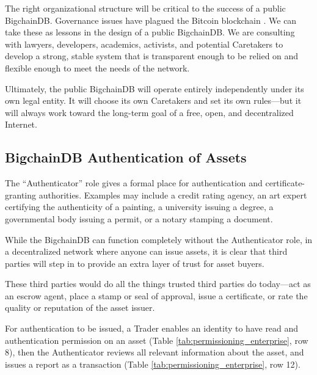 The right organizational structure will be critical to the success of a public BigchainDB.
Governance issues have plagued the Bitcoin blockchain \cite{popper2016bitcoin_crisis}.
We can take these as lessons in the design of a public BigchainDB.
We are consulting with lawyers, developers, academics, activists, and potential Caretakers to develop a strong, stable system that is transparent enough to be relied on and flexible enough to meet the needs of the network.

Ultimately, the public BigchainDB will operate entirely independently under its own legal entity.
It will choose its own Caretakers and set its own rules—but it will always work toward the long-term goal of a free, open, and decentralized Internet.

\medskip


\subsection{BigchainDB Authentication of Assets}\label{subsec:permissioning_authentication}

The “Authenticator” role gives a formal place for authentication and certificate-granting authorities.
Examples may include a credit rating agency, an art expert certifying the authenticity of a painting, a university issuing a degree, a governmental body issuing a permit, or a notary stamping a document.

While the BigchainDB can function completely without the Authenticator role, in a decentralized network where anyone can issue assets, it is clear that third parties will step in to provide an extra layer of trust for asset buyers.

These third parties would do all the things trusted third parties do today—act as an escrow agent, place a stamp or seal of approval, issue a certificate, or rate the quality or reputation of the asset issuer.

For authentication to be issued, a Trader enables an identity to have read and authentication permission on an asset (Table \ref{tab:permissioning_enterprise}, row 8), then the Authenticator reviews all relevant information about the asset, and issues a report as a transaction (Table \ref{tab:permissioning_enterprise}, row 12).

